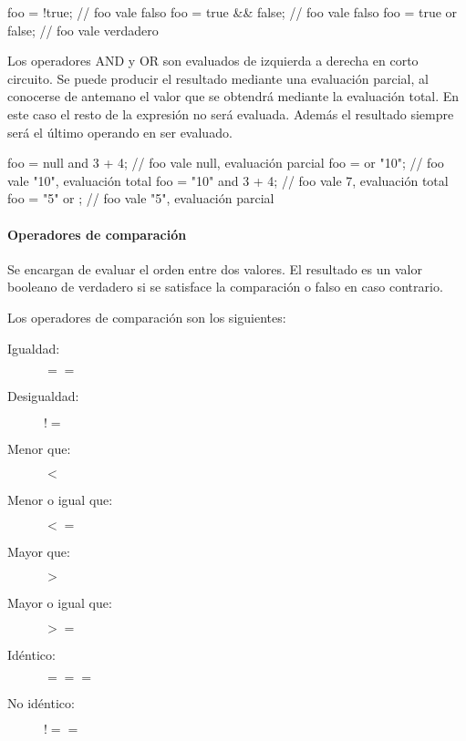 \begin{myverbatim}
   foo = !true; // foo vale falso
   foo = true && false; // foo vale falso
   foo = true or false; // foo vale verdadero
\end{myverbatim} 


Los operadores AND y OR son evaluados de izquierda a derecha en corto circuito. Se puede producir el resultado mediante una evaluación parcial, al conocerse de antemano el 
valor que se obtendrá mediante la evaluación total. En este caso el resto de la expresión no será evaluada. Además el resultado siempre será el último operando en ser evaluado. \\
 
\begin{myverbatim}
   foo = null and 3 + 4; // foo vale null, evaluación parcial 
   foo = {} or "10"; // foo vale "10", evaluación total
   foo = "10" and 3 + 4; // foo vale 7, evaluación total
   foo = "5" or {}; // foo vale "5", evaluación parcial
\end{myverbatim} 



\paragraph{Operadores de comparación}\label{sec:op_cmp}
Se encargan de evaluar el orden entre dos valores. El resultado es un valor booleano de verdadero si se satisface la comparación o falso en caso contrario.

Los operadores de comparación son los siguientes:

\begin{description}
\item [Igualdad:] $==$
\item [Desigualdad:] $!=$
\item [Menor que:] $<$
\item [Menor o igual que:] $<=$
\item [Mayor que:] $>$
\item [Mayor o igual que:] $>=$
\item [Idéntico:] $===$
\item [No idéntico:] $!==$
\end{description} 


